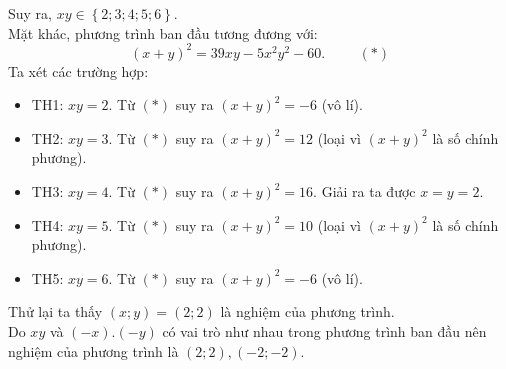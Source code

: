 \begin{ex}
{\begin{enumerate}[a)]
\begin{center}
\end{center}
Suy ra, $xy \in \left\{ {2;3;4;5;6} \right\}$.\\
Mặt khác, phương trình ban đầu tương đương với:
$$(x+y)^2=39xy-5x^2y^2-60.\hspace{1cm} (*)$$
Ta xét các trường hợp:
\begin{itemize}
\item TH1: $xy=2$. Từ $(*)$ suy ra $(x+y)^2=-6$ (vô lí).
\item TH2: $xy=3$. Từ $(*)$ suy ra $(x+y)^2=12$ (loại vì $(x+y)^2$ là số chính phương).
\item TH3: $xy=4$. Từ $(*)$ suy ra $(x+y)^2=16$. Giải ra ta được $x=y=2$.
\item TH4: $xy=5$. Từ $(*)$ suy ra $(x+y)^2=10$ (loại vì $(x+y)^2$ là số chính phương).
\item TH5: $xy=6$. Từ $(*)$ suy ra $(x+y)^2=-6$ (vô lí).
\end{itemize}
Thử lại ta thấy $(x;y)=(2;2)$ là nghiệm của phương trình.\\
Do $xy$ và $(-x).(-y)$ có vai trò như nhau trong phương trình ban đầu nên nghiệm của phương trình là 
$(2;2), (-2;-2)$.
\end{enumerate}
}
\end{ex}


